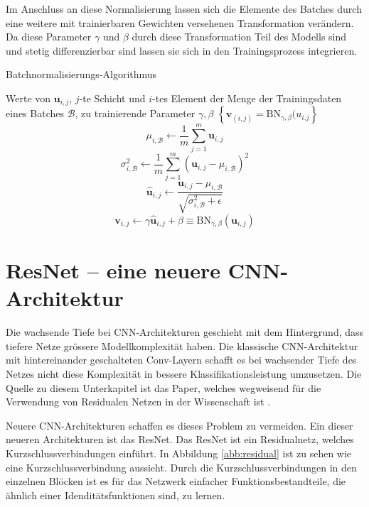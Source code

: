 Im Anschluss an diese Normalisierung lassen sich die Elemente des Batches durch eine weitere mit trainierbaren Gewichten versehenen Transformation verändern. Da diese Parameter $\gamma$ und $\beta$ durch diese Transformation Teil des Modells sind und stetig differenzierbar sind lassen sie sich in den Trainingsprozess integrieren.

\renewcommand{\algorithmicrequire}{\textbf{Eingabe:}}
\renewcommand{\algorithmicensure}{\textbf{Ausgabe:}}


\begin{algorithm}[H]
\caption{Batchnormalisierungs-Algorithmus}
\begin{algorithmic}
\REQUIRE Werte von $\mathbf{u}_{i,j}$, $j$-te  Schicht und $i$-tes Element der Menge der Trainingsdaten  eines Batches $\mathcal{B}$, zu trainierende Parameter $\gamma, \beta$
\ENSURE $\left\{ \mathbf{v}_{(i,j)} =\text{BN}_{\gamma, \beta}(u_{i.j} \right\} $
\STATE $$\mu_{i,\mathcal{B}} \leftarrow \frac{1}{m}\sum_{j=1}^{m} \mathbf{u}_{i,j}$$
\STATE $$\sigma^2_{i,\mathcal{B}} \leftarrow \frac{1}{m} \sum_{j=1}^m \left( \mathbf{u}_{i,j} -\mu_{i,\mathcal{B}}\right)^2$$
\STATE $$ \hat{\mathbf{u}}_{i,j} \leftarrow \frac{\mathbf{u}_{i,j}-\mu_{i,\mathcal{B}}}{\sqrt{\sigma_{i,\mathcal{B}}^2+\epsilon}}$$
\STATE $$\mathbf{v}_{i,j} \leftarrow \gamma \hat{\mathbf{u}}_{i,j} + \beta  \equiv \text{BN}_{\gamma,\beta}(\mathbf{u}_{i,j})$$
\end{algorithmic}
\label{alg:bn}
\end{algorithm}


\color{black}


\section{ResNet -- eine neuere CNN-Architektur}\label{sec:res}
Die wachsende Tiefe bei CNN-Architekturen geschieht mit dem Hintergrund, dass tiefere Netze grössere Modellkomplexität haben. Die klassische CNN-Architektur mit hintereinander geschalteten Conv-Layern schafft es bei wachsender Tiefe des Netzes nicht diese Komplexität in bessere Klassifikationsleistung umzusetzen. Die Quelle zu diesem Unterkapitel ist das Paper, welches wegweisend für die Verwendung von Residualen Netzen in der Wissenschaft ist \cite{resnet}.


Neuere CNN-Architekturen schaffen es dieses Problem zu vermeiden. Ein dieser neueren Architekturen ist das ResNet. Das ResNet ist ein Residualnetz, welches Kurzschlussverbindungen einführt. In Abbildung \ref{abb:residual} ist zu sehen wie eine Kurzschlussverbindung aussieht. Durch die Kurzschlussverbindungen in den einzelnen Blöcken ist es für das Netzwerk einfacher Funktionsbestandteile, die ähnlich einer Idenditätsfunktionen sind, zu lernen.   


